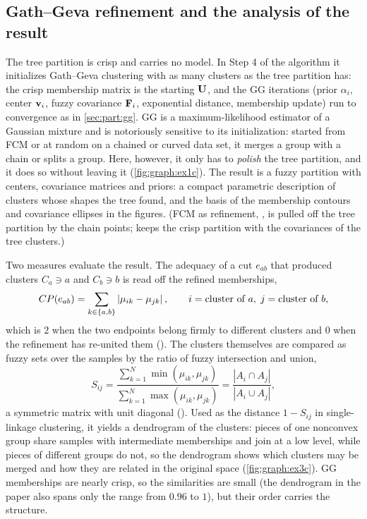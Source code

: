 \subsection{Gath--Geva refinement and the analysis of the result}\label{sec:graph:refine}

The tree partition is crisp and carries no model. In Step 4 of the algorithm it initializes Gath--Geva clustering with as many clusters as the tree partition has: the crisp membership matrix is the starting $\mathbf{U}$, and the GG iterations (prior $\alpha_i$, center $\mathbf{v}_i$, fuzzy covariance $\mathbf{F}_i$, exponential distance, membership update) run to convergence as in \cref{sec:part:gg}. GG is a maximum-likelihood estimator of a Gaussian mixture and is notoriously sensitive to its initialization: started from FCM or at random on a chained or curved data set, it merges a group with a chain or splits a group. Here, however, it only has to \emph{polish} the tree partition, and it does so without leaving it (\cref{fig:graph:ex1c}). The result is a fuzzy partition with centers, covariance matrices and priors: a compact parametric description of clusters whose shapes the tree found, and the basis of the membership contours and covariance ellipses in the figures. (FCM as refinement, , is pulled off the tree partition by the chain points;  keeps the crisp partition with the covariances of the tree clusters.)

Two measures evaluate the result. The adequacy of a cut $e_{ab}$ that produced clusters $C_a\ni a$ and $C_b\ni b$ is read off the refined memberships,
\begin{equation}
  CP(e_{ab})=\sum_{k\in\{a,b\}}\left\lvert \mu_{ik}-\mu_{jk} \right\rvert,\qquad i=\text{cluster of }a,\; j=\text{cluster of }b,
  \label{eq:graph:cp}
\end{equation}
which is $2$ when the two endpoints belong firmly to different clusters and $0$ when the refinement has re-united them (). The clusters themselves are compared as fuzzy sets over the samples by the ratio of fuzzy intersection and union,
\begin{equation}
  S_{ij}=\frac{\sum_{k=1}^{N}\min(\mu_{ik},\mu_{jk})}{\sum_{k=1}^{N}\max(\mu_{ik},\mu_{jk})}=\frac{|A_i\cap A_j|}{|A_i\cup A_j|},
  \label{eq:graph:similarity}
\end{equation}
a symmetric matrix with unit diagonal (). Used as the distance $1-S_{ij}$ in single-linkage clustering, it yields a dendrogram of the clusters: pieces of one nonconvex group share samples with intermediate memberships and join at a low level, while pieces of different groups do not, so the dendrogram shows which clusters may be merged and how they are related in the original space (\cref{fig:graph:ex3c}). GG memberships are nearly crisp, so the similarities are small (the dendrogram in the paper also spans only the range from $0.96$ to $1$), but their order carries the structure.

